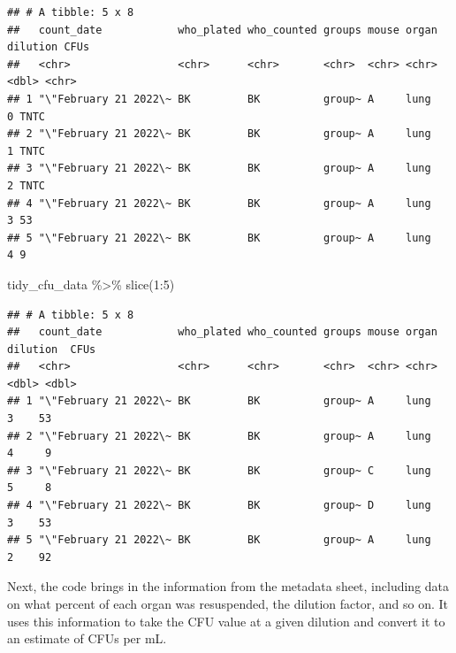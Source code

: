 \documentclass[
]{book}
\newenvironment{Shaded}{\begin{snugshade}}{\end{snugshade}}
\newcommand{\DecValTok}[1]{\textcolor[rgb]{0.00,0.00,0.81}{#1}}
\newcommand{\FunctionTok}[1]{\textcolor[rgb]{0.00,0.00,0.00}{#1}}
\newcommand{\NormalTok}[1]{#1}
\newcommand{\SpecialCharTok}[1]{\textcolor[rgb]{0.00,0.00,0.00}{#1}}
\begin{document}
\begin{verbatim}
## # A tibble: 5 x 8
##   count_date            who_plated who_counted groups mouse organ dilution CFUs 
##   <chr>                 <chr>      <chr>       <chr>  <chr> <chr>    <dbl> <chr>
## 1 "\"February 21 2022\~ BK         BK          group~ A     lung         0 TNTC 
## 2 "\"February 21 2022\~ BK         BK          group~ A     lung         1 TNTC 
## 3 "\"February 21 2022\~ BK         BK          group~ A     lung         2 TNTC 
## 4 "\"February 21 2022\~ BK         BK          group~ A     lung         3 53   
## 5 "\"February 21 2022\~ BK         BK          group~ A     lung         4 9
\end{verbatim}

\begin{Shaded}
\begin{Highlighting}[]
\NormalTok{tidy\_cfu\_data }\SpecialCharTok{\%\textgreater{}\%} 
  \FunctionTok{slice}\NormalTok{(}\DecValTok{1}\SpecialCharTok{:}\DecValTok{5}\NormalTok{)}
\end{Highlighting}
\end{Shaded}

\begin{verbatim}
## # A tibble: 5 x 8
##   count_date            who_plated who_counted groups mouse organ dilution  CFUs
##   <chr>                 <chr>      <chr>       <chr>  <chr> <chr>    <dbl> <dbl>
## 1 "\"February 21 2022\~ BK         BK          group~ A     lung         3    53
## 2 "\"February 21 2022\~ BK         BK          group~ A     lung         4     9
## 3 "\"February 21 2022\~ BK         BK          group~ C     lung         5     8
## 4 "\"February 21 2022\~ BK         BK          group~ D     lung         3    53
## 5 "\"February 21 2022\~ BK         BK          group~ A     lung         2    92
\end{verbatim}

Next, the code brings in the information from the metadata sheet, including data on
what percent of each organ was resuspended, the dilution factor, and so on.
It uses this information to take the CFU value at a given dilution and convert
it to an estimate of CFUs per mL.
\end{document}

